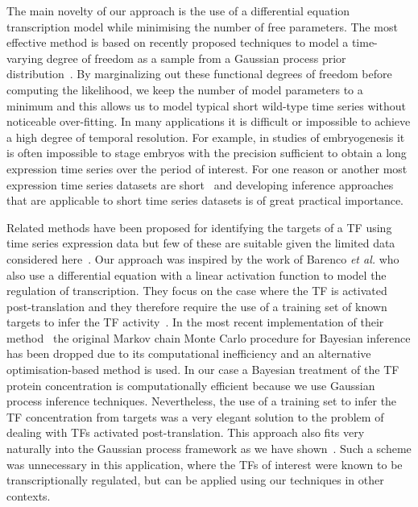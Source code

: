 \documentclass{pnastwo}
\begin{document}
\begin{article}
The main novelty of our approach is the use of a differential equation
transcription model while minimising the number of free parameters.
The most effective method is based on recently proposed
techniques to model a time-varying degree of freedom as a sample from
a Gaussian process prior distribution~\cite{Gao2008}. By marginalizing
out these functional
degrees of freedom before computing the likelihood, we keep the
number of model parameters to a minimum and this allows us to model
typical short wild-type time series without noticeable over-fitting. In
many applications it is difficult or impossible to achieve a high
degree of temporal resolution. For example, in studies of
embryogenesis it is often impossible to stage embryos with the
precision sufficient to obtain a long expression time series over the
period of interest. For one reason or another most expression time
series datasets are short~\cite{Ernst2005} and developing inference approaches
that are applicable to short time series datasets is of great
practical importance.

Related methods have been proposed for identifying the
targets of a TF using time series expression data but few of these are suitable given the
limited data considered here~\cite{Bansal2007a}. Our approach was inspired by the work of Barenco {\em et
al.} who also use a differential equation with a linear activation
function to model the regulation of transcription. They focus on the
case where the TF is activated post-translation and they therefore
require the use of a training set of
known targets to infer the TF activity~\cite{Barenco2006a}. In the most recent
implementation of their method~\cite{Barenco2009} the original Markov
chain Monte Carlo procedure for Bayesian inference has been dropped due to its computational
inefficiency and an alternative optimisation-based method is used. In our case a Bayesian treatment of the TF protein
concentration is computationally efficient because we use Gaussian
process inference techniques.
Nevertheless, the use of a training set to infer the
TF concentration from targets was a very elegant solution to the
problem of dealing with TFs activated post-translation. This
approach also fits very naturally into the Gaussian process
framework as we have shown~\cite{Gao2008}. Such a scheme was unnecessary in
this application,
where the TFs of interest were known to be transcriptionally
regulated, but can be applied using our techniques in other
contexts.


\end{article}
\end{document}
